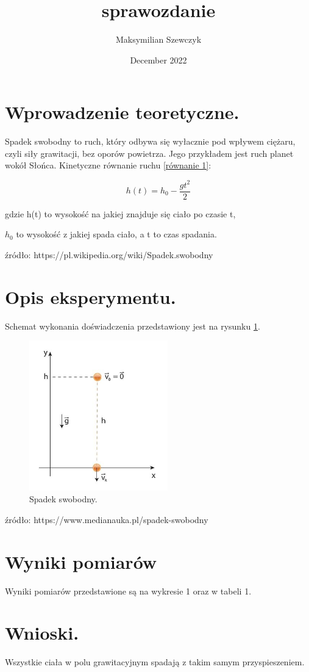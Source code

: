 \documentclass{article}
\title{sprawozdanie}
\author{Maksymilian Szewczyk}
\date{December 2022}
\begin{document}
\maketitle

\section{Wprowadzenie teoretyczne.}

Spadek swobodny to ruch, który odbywa się wyłacznie pod wpływem ciężaru, czyli siły grawitacji, bez oporów powietrza. Jego przykładem jest ruch planet wokół Słońca. Kinetyczne równanie ruchu \ref{równanie 1}:

\begin{equation}
\label{równanie 1}
    h(t) = h_0 - \frac{gt^2}{2}
\end{equation}    


gdzie h(t) to wysokość na jakiej znajduje się ciało po czasie t, 

$h_0$ to wysokość z jakiej spada ciało, a t to czas spadania.

\vspace{5mm} %

źródło: https://pl.wikipedia.org/wiki/Spadek.swobodny

\section{Opis eksperymentu.}

Schemat wykonania doświadczenia przedstawiony jest na rysunku \ref{spadek.swobodny}.

\begin{figure}[htbp]
\includegraphics[width=6cm]{zdj.jpg}
\centering
\caption{Spadek swobodny.}
\label{spadek.swobodny}
\end{figure}

\vspace{5mm} %
źródło: https://www.medianauka.pl/spadek-swobodny 

\section{Wyniki pomiarów}

Wyniki pomiarów przedstawione są na wykresie 1 oraz w tabeli 1.

\section{Wnioski.}

Wszystkie ciała w polu grawitacyjnym spadają z takim samym przyspieszeniem.
\end{document}
